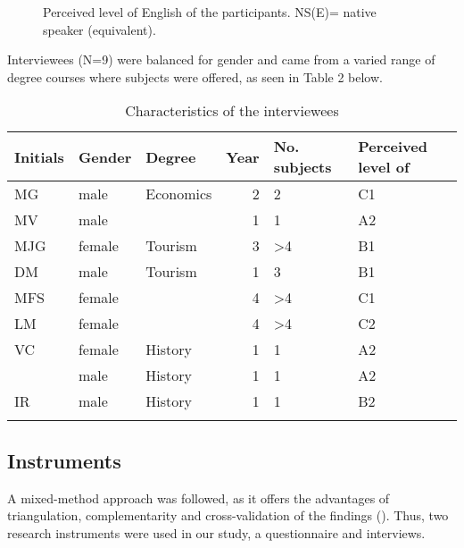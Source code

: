 \documentclass[output=paper]{langsci/langscibook}
\begin{document}
\begin{figure}
\caption{Perceived level of English of the participants. NS(E)= native speaker (equivalent).} 
\label{fig:moratinos:1}
\end{figure}


   
 



Interviewees (N=9) were balanced for gender and came from a varied range of degree courses where  subjects were offered, as seen in Table 2 below. 


\begin{table}
\caption{Characteristics of the interviewees}
\label{tab:moratinos:2}

\begin{tabularx}{\textwidth}{lllrYY}
\lsptoprule
 Initials & Gender & Degree & Year & No.  subjects & Perceived level of \\
 \midrule
 MG & male & Economics & 2 & 2 & C1\\
 MV & male &  & 1 & 1 & A2\\
 MJG & female & Tourism & 3 & >4 & B1\\
 DM & male & Tourism & 1 & 3 & B1\\
 MFS & female &  & 4 & >4 & C1\\
 LM & female &  & 4 & >4 & C2\\
 VC & female & History & 1 & 1 & A2\\
  & male & History & 1 & 1 & A2\\
 IR & male & History & 1 & 1 & B2\\
\lspbottomrule
\end{tabularx}
\end{table}

\subsection{Instruments}

A mixed-method approach was followed, as it offers the advantages of triangulation, complementarity and cross-validation of the findings (\citealt{IvankovaGreer2015}). Thus, two research instruments were used in our study, a questionnaire and interviews. 
\end{document}
